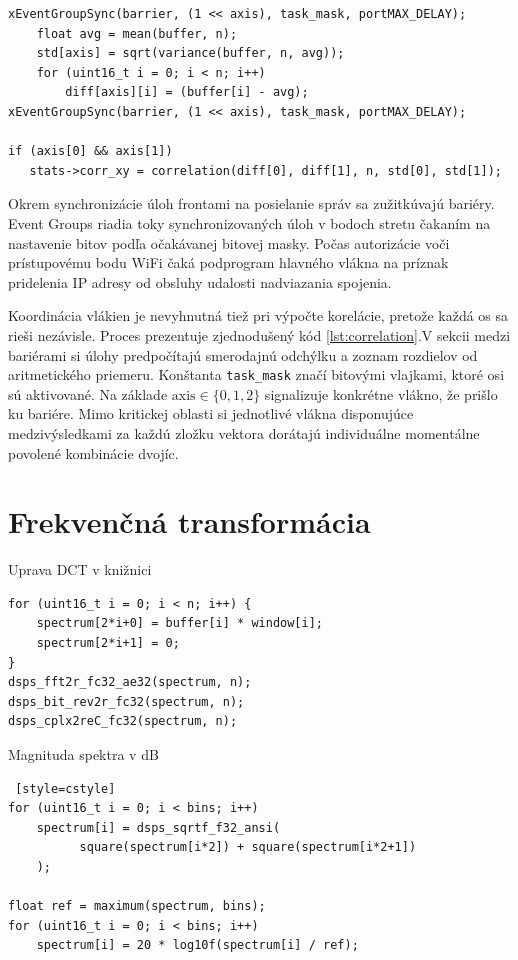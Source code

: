 \begin{lstlisting}[style=cstyle,caption=Synchronizácia úloh na výpočet korelácie osí,label={lst:correlation},
morekeywords={xEventGroupSync}]
xEventGroupSync(barrier, (1 << axis), task_mask, portMAX_DELAY);
	float avg = mean(buffer, n);
	std[axis] = sqrt(variance(buffer, n, avg));
	for (uint16_t i = 0; i < n; i++)
		diff[axis][i] = (buffer[i] - avg);
xEventGroupSync(barrier, (1 << axis), task_mask, portMAX_DELAY);

if (axis[0] && axis[1])
   stats->corr_xy = correlation(diff[0], diff[1], n, std[0], std[1]);
\end{lstlisting}

Okrem synchronizácie úloh frontami na posielanie správ sa zužitkúvajú bariéry. Event Groups riadia toky 
synchronizovaných úloh v bodoch stretu čakaním na nastavenie bitov podľa očakávanej bitovej masky. Počas
autorizácie voči prístupovému bodu WiFi čaká podprogram hlavného vlákna na príznak pridelenia IP adresy
od obsluhy udalosti nadviazania spojenia. 

Koordinácia vlákien je nevyhnutná tiež pri výpočte korelácie, pretože každá os sa rieši nezávisle. Proces prezentuje zjednodušený
kód \ref{lst:correlation}.V sekcii medzi bariérami si úlohy predpočítajú smerodajnú odchýlku a zoznam rozdielov 
od aritmetického priemeru. Konštanta \verb|task_mask| značí bitovými vlajkami, ktoré osi sú aktivované. 
Na základe $\mathrm{axis} \in \{0,1,2\}$ signalizuje konkrétne vlákno, že prišlo ku bariére. Mimo kritickej oblasti 
si jednotlivé vlákna disponujúce medzivýsledkami za každú zložku vektora dorátajú individuálne momentálne povolené 
kombinácie dvojíc.

\section{Frekvenčná transformácia}
Uprava DCT v knižnici
\begin{lstlisting}[style=cstyle,caption=Transformácia do frekvenčnej domény]
for (uint16_t i = 0; i < n; i++) {
	spectrum[2*i+0] = buffer[i] * window[i]; 
	spectrum[2*i+1] = 0;
}
dsps_fft2r_fc32_ae32(spectrum, n);
dsps_bit_rev2r_fc32(spectrum, n);
dsps_cplx2reC_fc32(spectrum, n);
\end{lstlisting}
 
Magnituda spektra v dB
\begin{lstlisting} [style=cstyle]         
for (uint16_t i = 0; i < bins; i++)
	spectrum[i] = dsps_sqrtf_f32_ansi(
          square(spectrum[i*2]) + square(spectrum[i*2+1])
    );

float ref = maximum(spectrum, bins);
for (uint16_t i = 0; i < bins; i++)
	spectrum[i] = 20 * log10f(spectrum[i] / ref);
\end{lstlisting}


